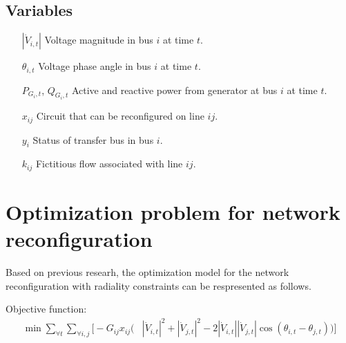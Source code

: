 \documentclass{article}
\begin{document}
\subsection*{Variables}
\begin{itemize}
\item[$\left|\dot{V}_{i,t} \right|$] Voltage magnitude in bus $i$ at time $t$.
\item[$\theta_{i,t}$] Voltage phase angle in bus $i$ at time $t$.
\item[$P_{G_{i},t}$, $Q_{G_{i},t}$] Active and reactive power from generator at bus $i$ at time $t$.
\item[$x_{ij}$] Circuit that can be reconfigured on line $ij$.
\item[$y_{i}$] Status of transfer bus in bus $i$.  
\item[$k_{ij}$] Fictitious flow associated with line $ij$.
\end{itemize}


\section{Optimization problem for network reconfiguration}
Based on previous researh, the optimization model for the network reconfiguration with radiality constraints can be respresented as follows\cite{5982115}.

Objective function:
\begin{equation}
  \begin{split}
  \min{} \sum_{\forall t}\sum_{\forall i,j}
  \bigl[-G_{ij}x_{ij} \bigl( & \left|\dot{V}_{i,t} \right|^2 + \left|\dot{V}_{j,t} \right|^2 - 2\left|\dot{V}_{i,t} \right|\left|\dot{V}_{j,t} \right|\cos\left(\theta_{i,t}-\theta_{j,t} \right) \bigr) \bigr]
  \end{split}
\label{eq:NR_obj}
\end{equation} 
\end{document}
